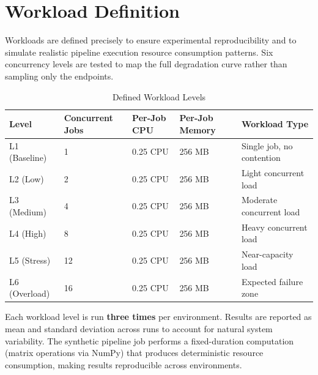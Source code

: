 \section{Workload Definition}

Workloads are defined precisely to ensure experimental reproducibility and to simulate
realistic pipeline execution resource consumption patterns. Six concurrency levels are
tested to map the full degradation curve rather than sampling only the endpoints.

\begin{table}[H]
\centering
\caption{Defined Workload Levels}
\label{tab:workloads}
\begin{tabularx}{\textwidth}{lXXXX}
\toprule
\textbf{Level} & \textbf{Concurrent Jobs} & \textbf{Per-Job CPU} & \textbf{Per-Job Memory} & \textbf{Workload Type} \\
\midrule
L1 (Baseline)   &  1 & 0.25 CPU & 256 MB & Single job, no contention \\
L2 (Low)        &  2 & 0.25 CPU & 256 MB & Light concurrent load \\
L3 (Medium)     &  4 & 0.25 CPU & 256 MB & Moderate concurrent load \\
L4 (High)       &  8 & 0.25 CPU & 256 MB & Heavy concurrent load \\
L5 (Stress)     & 12 & 0.25 CPU & 256 MB & Near-capacity load \\
L6 (Overload)   & 16 & 0.25 CPU & 256 MB & Expected failure zone \\
\bottomrule
\end{tabularx}
\end{table}

Each workload level is run \textbf{three times} per environment. Results are reported as
mean and standard deviation across runs to account for natural system variability. The
synthetic pipeline job performs a fixed-duration computation (matrix operations via NumPy)
that produces deterministic resource consumption, making results reproducible across
environments.
